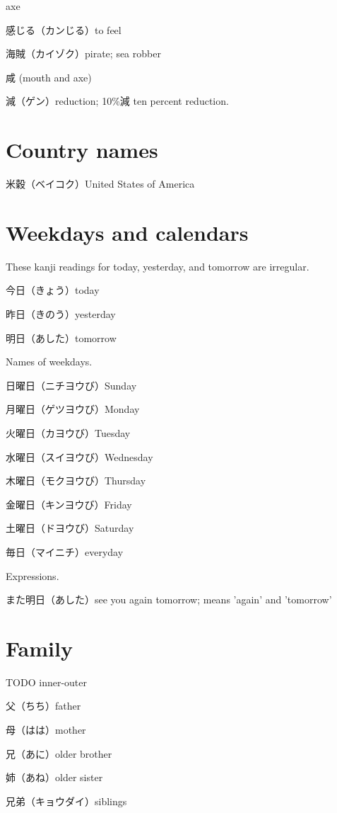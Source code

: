 axe

感じる（カンじる）to feel

海賊（カイゾク）pirate; sea robber

咸 (mouth and axe)

減（ゲン）reduction; 10\%減 ten percent reduction.

\section{Country names}

米穀（ベイコク）United States of America

\section{Weekdays and calendars}

These kanji readings for today, yesterday, and tomorrow are irregular.

今日（きょう）today

昨日（きのう）yesterday

明日（あした）tomorrow

Names of weekdays.

日曜日（ニチヨウび）Sunday

月曜日（ゲツヨウび）Monday

火曜日（カヨウび）Tuesday

水曜日（スイヨウび）Wednesday

木曜日（モクヨウび）Thursday

金曜日（キンヨウび）Friday

土曜日（ドヨウび）Saturday

毎日（マイニチ）everyday

Expressions.

また明日（あした）see you again tomorrow; means 'again' and 'tomorrow'

\section{Family}

TODO inner-outer

父（ちち）father

母（はは）mother

兄（あに）older brother

姉（あね）older sister

兄弟（キョウダイ）siblings
